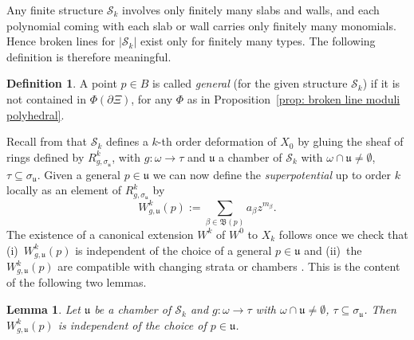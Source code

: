 \documentclass[11pt,letter]{amsart}
\newtheorem{lemma}[theorem]{Lemma}
\theoremstyle{definition}
\newtheorem{definition}[theorem]{Definition}
\theoremstyle{remark}
\numberwithin{equation}{section}
\numberwithin{figure}{section}
\newcommand {\foB}  {\mathfrak{B}}
\newcommand {\fou}  {\mathfrak{u}}
\newcommand {\scrS}  {\mathscr{S}}
\begin{document}
Any finite structure $\scrS_k$ involves only finitely many slabs and walls, and
each polynomial coming with each slab or wall carries only finitely many
monomials. Hence broken lines for $|\scrS_k|$ exist only for finitely many
types. The following definition is therefore meaningful.

\begin{definition}
\label{def: general points}
A point $p\in B$ is called \emph{general} (for the given structure $\scrS_k$) if
it is not contained in $\Phi(\partial \Xi)$, for any $\Phi$ as in
Proposition~\ref{prop: broken line moduli polyhedral}.
\end{definition}

Recall from \cite[\S2.6]{affinecomplex} that $\scrS_k$ defines a $k$-th order
deformation of $X_0$ by gluing the sheaf of rings defined by
$R^k_{g,\sigma_\fou}$, with $g:\omega\to\tau$ and $\fou$ a chamber of $\scrS_k$
with $\omega\cap\fou\neq\emptyset$, $\tau\subseteq\sigma_\fou$. Given a general
$p\in \fou$ we can now define the \emph{superpotential} up to order $k$ locally
as an element of $R^k_{g,\sigma_\fou}$ by
\begin{equation}
\label{Eqn: W^k}
W^k_{g,\fou}(p):=\sum_{\beta\in \foB(p)} a_\beta z^{m_\beta}.
\end{equation}
The existence of a canonical extension $W^k$ of $W^0$ to $X_k$ follows once we
check that (i)~$W^k_{g,\fou}(p)$ is independent of the choice of a general
$p\in\fou$ and (ii)~the $W^k_{g,\fou}(p)$ are compatible with changing strata or
chambers \cite[Constr.\,2.24]{affinecomplex}. This is the content of the
following two lemmas.

\begin{lemma}
\label{lem:independence of p}
Let $\fou$ be a chamber of $\scrS_k$ and $g:\omega\to\tau$ with $\omega\cap\fou
\neq\emptyset$, $\tau\subseteq\sigma_\fou$. Then $W^k_{g,\fou}(p)$ is
independent of the choice of $p\in\fou$.
\end{lemma}
\end{document}
